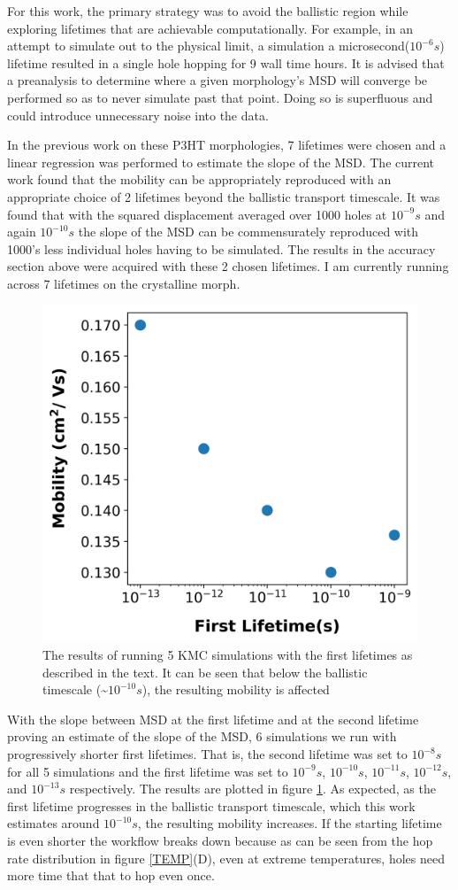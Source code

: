For this work, the primary strategy was to avoid the ballistic region while exploring lifetimes
that are achievable computationally. For example, in an attempt to simulate out to the physical limit, a
simulation a microsecond($10^{-6}s$) lifetime resulted in a single hole hopping for 9 wall time hours.
It is advised that a preanalysis to determine where a given morphology's MSD will converge be performed so as
to never simulate past that point. Doing so is superfluous and could introduce unnecessary noise into the data. 

In the previous work on these P3HT morphologies, 7 lifetimes were chosen and a linear regression was performed
to estimate the slope of the MSD. The current work found that the mobility can be appropriately reproduced
with an appropriate choice of 2 lifetimes beyond the ballistic transport timescale. It was found that with the 
squared displacement averaged over 1000 holes at $10^{-9}s$ and again $10^{-10}s$ the slope of the MSD can be
commensurately reproduced with 1000's less individual holes having to be simulated. The results in the accuracy
section above were acquired with these 2 chosen lifetimes. I am currently running across 7 lifetimes on the
crystalline morph. 

\begin{figure}
  \center
  \includegraphics[width=0.6\linewidth]{figures/lifetime.png} 
    \caption{The results of running 5 KMC simulations with the first lifetimes as described in the text. It
    can be seen that below the ballistic timescale ({\sim}$10^{-10}s$), the resulting mobility is affected}
  \label{lifetime}
\end{figure}

With the slope between MSD at the first lifetime and at the second lifetime proving an estimate of the slope
of the MSD, 6 simulations we run with progressively shorter first lifetimes. That is, the second lifetime was
set to $10^{-8}s$ for all 5 simulations and the first lifetime was set to $10^{-9}s$, $10^{-10}s$,
$10^{-11}s$, $10^{-12}s$, and $10^{-13}s$ respectively. The results are plotted in figure
\ref{lifetime}. As expected, as the first lifetime progresses in the ballistic transport timescale, which this work
estimates around $10^{-10}s$, the resulting mobility increases. If the starting lifetime is even shorter the
workflow breaks down because as can be seen from the hop rate distribution in figure \ref{TEMP}(D), even at
extreme temperatures, holes need more time that that to hop even once. 

